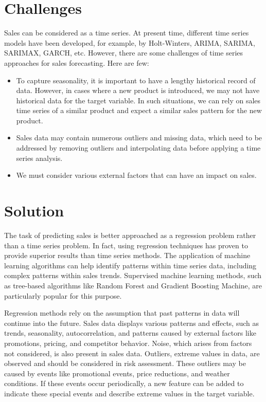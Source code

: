 \medskip

\section{Challenges}

Sales can be considered as a time series. At present time, different time series models have been developed, for example, by Holt-Winters, \ac{ARIMA}, \ac{SARIMA}, \ac{SARIMAX}, \ac{GARCH}, etc. However, there are some challenges of time series approaches for sales forecasting. Here are few:
	\begin{itemize}
		\item To capture seasonality, it is important to have a lengthy historical record of data. However, in cases where a new product is introduced, we may not have historical data for the target variable. In such situations, we can rely on sales time series of a similar product and expect a similar sales pattern for the new product. 
		\item Sales data may contain numerous outliers and missing data, which need to be addressed by removing outliers and interpolating data before applying a time series analysis. 
		\item We must consider various external factors that can have an impact on sales.\cite{Pavlyshenko:2019}
	\end{itemize}



 \medskip

\section{Solution}

The task of predicting sales is better approached as a regression problem rather than a time series problem. In fact, using regression techniques has proven to provide superior results than time series methods. The application of machine learning algorithms can help identify patterns within time series data, including complex patterns within sales trends. Supervised machine learning methods, such as tree-based algorithms like Random Forest and Gradient Boosting Machine, are particularly popular for this purpose.

Regression methods rely on the assumption that past patterns in data will continue into the future. Sales data displays various patterns and effects, such as trends, seasonality, autocorrelation, and patterns caused by external factors like promotions, pricing, and competitor behavior. Noise, which arises from factors not considered, is also present in sales data. Outliers, extreme values in data, are observed and should be considered in risk assessment. These outliers may be caused by events like promotional events, price reductions, and weather conditions. If these events occur periodically, a new feature can be added to indicate these special events and describe extreme values in the target variable. \cite{Pavlyshenko:2019} 

